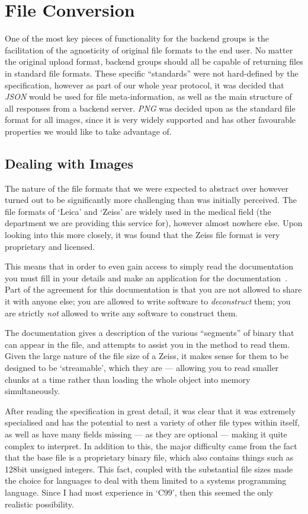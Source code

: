\section{File Conversion}
One of the most key pieces of functionality for the backend groups is the facilitation of the agnosticity of
original file formats to the end user. No matter the original upload format, backend groups should all be
capable of returning files in standard file formats.
These specific ``standards'' were not hard-defined by the specification, however as part of our whole year
protocol, it was decided that \emph{JSON} would be used for file meta-information, as well as the
main structure of all responses from a backend server. \emph{PNG} was decided upon as the standard file format
for all images, since it is very widely supported and has other favourable properties we would like to
take advantage of.

\subsection{Dealing with Images}
The nature of the file formats that we were expected to abstract over however turned out to be significantly
more challenging than was initially perceived. The file formats of `Leica' and `Zeiss' are widely used in the
medical field (the department we are providing this service for), however almost nowhere else. Upon looking
into this more closely, it was found that the Zeiss file format is very proprietary and licensed.

This means that in order to even gain access to simply read the documentation you must fill in your details
and make an application for the documentation~\cite{zeissLicence}. Part of the agreement for this documentation is that you are
not allowed to share it with anyone else; you are allowed to write software to \emph{deconstruct} them; you
are strictly \emph{not} allowed to write any software to construct them.

The documentation gives a description of the various ``segments'' of binary that can appear in the file, and
attempts to assist you in the method to read them. Given the large nature of the file size of a Zeiss, it makes
sense for them to be designed to be `streamable', which they are --- allowing you to read smaller chunks at a
time rather than loading the whole object into memory simultaneously.

After reading the specification in great detail, it was clear that it was extremely specialised and has
the potential to nest a variety of other file types within itself, as well as have many fields missing
--- as they are optional --- making it quite complex to interpret. In addition to this, the major difficulty
came from the fact that the base file is a proprietary binary file, which also contains things such as 128bit
unsigned integers. This fact, coupled with the substantial file sizes made the choice for languages to deal
with them limited to a systems programming language. Since I had most experience in `C99', then this seemed
the only realistic possibility.

